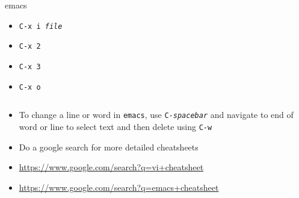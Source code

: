 \documentclass[slidestop,mathserif,compress,xcolor=svgnames]{beamer}
\newenvironment{eblock}[0]
{
\begin{beamerboxesrounded}[upper=uppercol2,lower=lowercol2,shadow=true]}
{\end{beamerboxesrounded}}
\begin{document}
\begin{frame}[allowframebreaks]
{\begin{columns}
\begin{eblock}{emacs}
\begin{itemize}
      \item \texttt{C-x i \textit{file}}
      \item \texttt{C-x 2}
      \item \texttt{C-x 3}
      \item \texttt{C-x o}
    \end{itemize}
    \end{eblock}
  \end{columns}
  }
  \begin{itemize}
    \item {\tiny To change a line or word in \texttt{emacs}, use \texttt{C-\textit{spacebar}} and navigate to end of word or line to select text and then delete using \texttt{C-w}}
  \end{itemize}
  \framebreak
  \begin{itemize}
    \item Do a google search for more detailed cheatsheets
    \item[\texttt{vi}] \url{https://www.google.com/search?q=vi+cheatsheet}
    \item[\texttt{emacs}] \url{https://www.google.com/search?q=emacs+cheatsheet}
  \end{itemize}
\end{frame}
\end{document}
